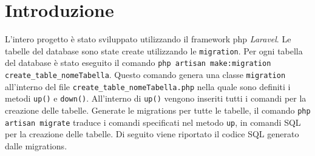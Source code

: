 \documentclass[paper=a4, fontsize=11pt,x11names]{report}
\begin{document}
\section{Introduzione}
L'intero progetto è stato sviluppato utilizzando il framework php \textit{Laravel}. Le tabelle del database sono state create utilizzando le \texttt{migration}. Per ogni tabella del database è stato eseguito il comando \texttt{php artisan make:migration create\_table\_nomeTabella}. Questo comando genera una classe \texttt{migration} all'interno del file \texttt{create\_table\_nomeTabella.php} nella quale sono definiti i metodi \texttt{up()} e \texttt{down()}. All'interno di \texttt{up()} vengono inseriti tutti i comandi per la creazione delle tabelle. Generate le migrations per tutte le tabelle, il comando \texttt{php artisan migrate} traduce i comandi specificati nel metodo \texttt{up}, in comandi SQL per la creazione delle tabelle. Di seguito viene riportato il codice SQL generato dalle migrations.
\end{document}
